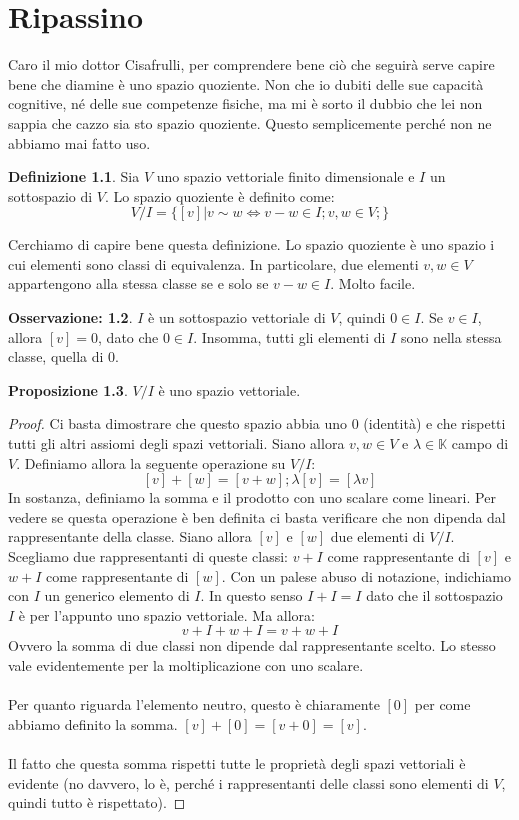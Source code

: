 \documentclass[12pt,a4paper]{report}
\theoremstyle{definition}
\newtheorem{Def}{Definizione}[chapter]
\theoremstyle{Theorem}
\newtheorem{Prop}[Def]{Proposizione}
\theoremstyle{definition}
\theoremstyle{definition}
\theoremstyle{definition}
\newtheorem{Obs}[Def]{Osservazione:}
\begin{document}
	\chapter{Ripassino}
	Caro il mio dottor Cisafrulli, per comprendere bene ciò che seguirà serve capire bene che diamine è uno spazio quoziente. Non che io dubiti delle sue capacità cognitive, né delle sue competenze fisiche, ma mi è sorto il dubbio che lei non sappia che cazzo sia sto spazio quoziente. Questo semplicemente perché non ne abbiamo mai fatto uso.
	\begin{Def}
		Sia $V$ uno spazio vettoriale finito dimensionale e $I$ un sottospazio di $V$. Lo spazio quoziente è definito come:
		$$V/I=\{[v]|v\sim w \iff v-w\in I;v,w\in V; \}$$
	\end{Def}
	Cerchiamo di capire bene questa definizione. Lo spazio quoziente è uno spazio i cui elementi sono classi di equivalenza. In particolare, due elementi $v,w\in V$ appartengono alla stessa classe se e solo se $v-w\in I$. Molto facile.
	\begin{Obs}
		$I$ è un sottospazio vettoriale di $V$, quindi $0\in I$. Se $v\in I$, allora $[v]=0$, dato che $0\in I$. Insomma, tutti gli elementi di $I$ sono nella stessa classe, quella di $0$.
	\end{Obs}
	\begin{Prop}
		$V/I$ è uno spazio vettoriale.
	\end{Prop}
	\begin{proof}
		Ci basta dimostrare che questo spazio abbia uno $0$ (identità) e che rispetti tutti gli altri assiomi degli spazi vettoriali.
		Siano allora $v,w\in V$ e $\lambda\in \mathbb{K}$ campo di $V$. Definiamo allora la seguente operazione su $V/I$:
		$$[v]+[w]=[v+w]; \lambda[v]=[\lambda v]$$
		In sostanza, definiamo la somma e il prodotto con uno scalare come lineari. Per vedere se questa operazione è ben definita ci basta verificare che non dipenda dal rappresentante della classe. Siano allora $[v]$ e $[w]$ due elementi di $V/I$. Scegliamo due rappresentanti di queste classi:
		$v+I$ come rappresentante di $[v]$ e $w+I$ come rappresentante di $[w]$. Con un palese abuso di notazione, indichiamo con $I$ un generico elemento di $I$. In questo senso $I+I=I$ dato che il sottospazio $I$ è per l'appunto uno spazio vettoriale. Ma allora:
		$$v+I+w+I=v+w+I$$
		Ovvero la somma di due classi non dipende dal rappresentante scelto. Lo stesso vale evidentemente per la moltiplicazione con uno scalare.\\
		\\
		Per quanto riguarda l'elemento neutro, questo è chiaramente $[0]$ per come abbiamo definito la somma. $[v]+[0]=[v+0]=[v]$.\\
		\\
		Il fatto che questa somma rispetti tutte le proprietà degli spazi vettoriali è evidente (no davvero, lo è, perché i rappresentanti delle classi sono elementi di $V$, quindi tutto è rispettato). 	
	\end{proof}
\end{document}
